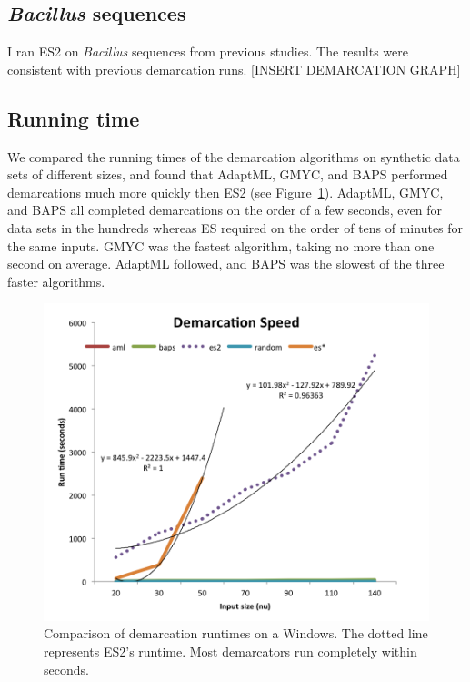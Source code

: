 \subsection*{\emph{Bacillus} sequences}
I ran ES2 on \emph{Bacillus} sequences from previous studies.
The results were consistent with previous demarcation runs. [INSERT DEMARCATION GRAPH]

\subsection*{Running time}
We compared the running times of the demarcation algorithms on synthetic data sets of different sizes, and found that AdaptML, GMYC, and BAPS performed demarcations much more quickly then ES2 (see Figure~\ref{fig:WindowsSpeed}).
AdaptML, GMYC, and BAPS all completed demarcations on the order of a few seconds, even for data sets in the hundreds whereas ES required on the order of tens of minutes for the same inputs.
GMYC was the fastest algorithm, taking no more than one second on average.
AdaptML followed, and BAPS was the slowest of the three faster algorithms.

\begin{figure}[h!]
  \centering
    \includegraphics[scale=0.7]{images/SpeedWindows-CH4}
      \caption[Demarcation run time test on Windows.]{Comparison of demarcation runtimes on a Windows. The dotted line represents ES2's runtime. Most demarcators run completely within seconds.}
    \label{fig:WindowsSpeed}
\end{figure}


